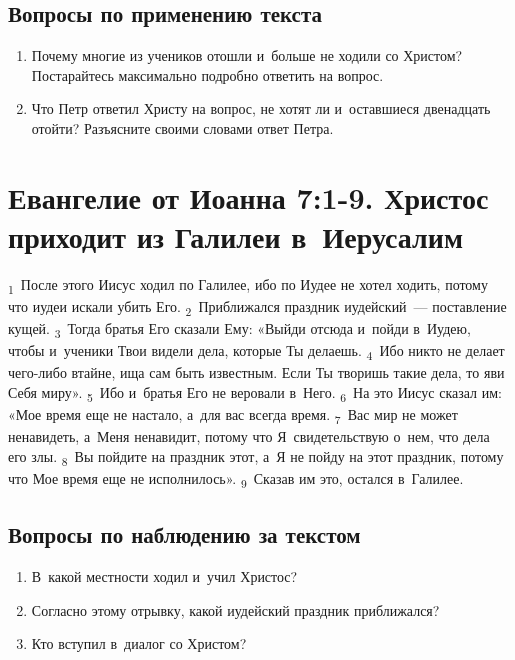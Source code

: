 \documentclass[a4paper,12pt]{article}
\begin{document}
\subsection*{Вопросы по применению текста} 
\begin{enumerate}
    \item Почему многие из учеников отошли и~больше не ходили со Христом? Постарайтесь максимально подробно ответить на вопрос. 
    
    \myline
    
    \myline
    \item Что Петр ответил Христу на вопрос, не хотят ли и~оставшиеся двенадцать отойти? Разъясните своими словами ответ Петра. 
    
    \myline
    
    \myline
\end{enumerate}



\section{Евангелие от Иоанна 7:1-9. Христос приходит из Галилеи в~Иерусалим}

 \textsubscript{1}~После этого Иисус ходил по Галилее, ибо по Иудее не хотел ходить, потому что иудеи искали убить Его. \textsubscript{2}~Приближался праздник иудейский~--- поставление кущей. \textsubscript{3}~Тогда братья Его сказали Ему: «Выйди отсюда и~пойди в~Иудею, чтобы и~ученики Твои видели дела, которые Ты делаешь. \textsubscript{4}~Ибо никто не делает чего-либо втайне, ища сам быть известным. Если Ты творишь такие дела, то яви Себя миру». \textsubscript{5}~Ибо и~братья Его не веровали в~Него. \textsubscript{6}~На это Иисус сказал им: «Мое время еще не настало, а~для вас всегда время. \textsubscript{7}~Вас мир не может ненавидеть, а~Меня ненавидит, потому что Я~свидетельствую о~нем, что дела его злы. \textsubscript{8}~Вы пойдите на праздник этот, а~Я не пойду на этот праздник, потому что Мое время еще не исполнилось». \textsubscript{9}~Сказав им это, остался в~Галилее.

\subsection*{Вопросы по наблюдению за текстом}
\begin{enumerate}
    \item В~какой местности ходил и~учил Христос? 
    
    \myline
    
    \item Согласно этому отрывку, какой иудейский праздник приближался? 
    
    \myline
    
    \item Кто вступил в~диалог со Христом? 
    
    \myline
    
\end{enumerate}
\end{document}
